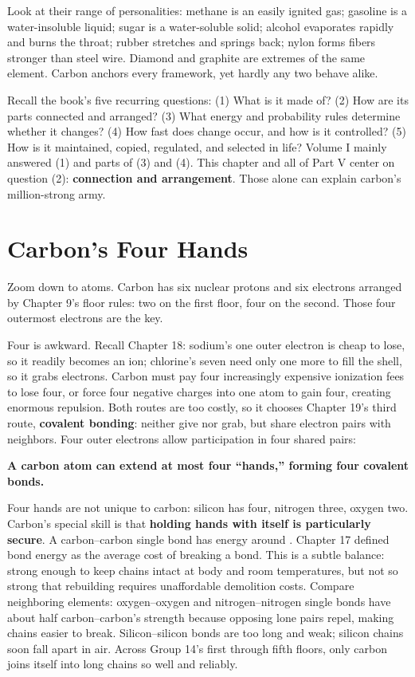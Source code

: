 Look at their range of personalities: methane is an easily ignited gas; gasoline is a water-insoluble liquid; sugar is a water-soluble solid; alcohol evaporates rapidly and burns the throat; rubber stretches and springs back; nylon forms fibers stronger than steel wire. Diamond and graphite are extremes of the same element. Carbon anchors every framework, yet hardly any two behave alike.

Recall the book's five recurring questions: (1) What is it made of? (2) How are its parts connected and arranged? (3) What energy and probability rules determine whether it changes? (4) How fast does change occur, and how is it controlled? (5) How is it maintained, copied, regulated, and selected in life? Volume I mainly answered (1) and parts of (3) and (4). This chapter and all of Part V center on question (2): \textbf{connection and arrangement}. Those alone can explain carbon's million-strong army.

\section{Carbon's Four Hands}

Zoom down to atoms. Carbon has six nuclear protons and six electrons arranged by Chapter 9's floor rules: two on the first floor, four on the second. Those four outermost electrons are the key.

Four is awkward. Recall Chapter 18: sodium's one outer electron is cheap to lose, so it readily becomes an ion; chlorine's seven need only one more to fill the shell, so it grabs electrons. Carbon must pay four increasingly expensive ionization fees to lose four, or force four negative charges into one atom to gain four, creating enormous repulsion. Both routes are too costly, so it chooses Chapter 19's third route, \textbf{covalent bonding}: neither give nor grab, but share electron pairs with neighbors. Four outer electrons allow participation in four shared pairs:

\textbf{A carbon atom can extend at most four ``hands,'' forming four covalent bonds.}

Four hands are not unique to carbon: silicon has four, nitrogen three, oxygen two. Carbon's special skill is that \textbf{holding hands with itself is particularly secure}. A carbon--carbon single bond has energy around . Chapter 17 defined bond energy as the average cost of breaking a bond. This is a subtle balance: strong enough to keep chains intact at body and room temperatures, but not so strong that rebuilding requires unaffordable demolition costs. Compare neighboring elements: oxygen--oxygen and nitrogen--nitrogen single bonds have about half carbon--carbon's strength because opposing lone pairs repel, making chains easier to break. Silicon--silicon bonds are too long and weak; silicon chains soon fall apart in air. Across Group 14's first through fifth floors, only carbon joins itself into long chains so well and reliably.

